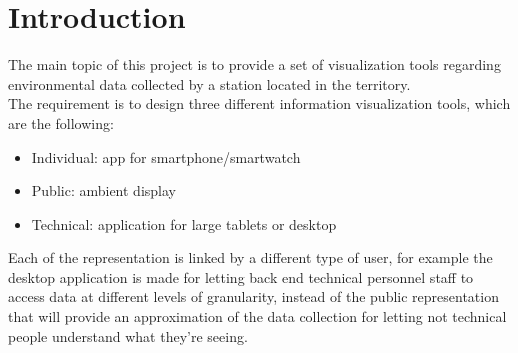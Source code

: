 \documentclass[12pt]{article} %
\begin{document}



\tableofcontents %

\newpage %


\section{Introduction} %
The main topic of this project is to provide a set of visualization tools regarding environmental data collected by a station located in the territory.\\
The requirement is to design three different information visualization tools, which are the following:
\begin{itemize}
\item Individual: app for smartphone/smartwatch
\item Public: ambient display
\item Technical: application for large tablets or desktop
\end{itemize}
Each of the representation is linked by a different type of user, for example the desktop application is made for  letting back end technical personnel  staff to access data at different levels of granularity, instead of the public representation that will provide an approximation of the data collection for letting not technical people understand what they're seeing.\\
\end{document}
